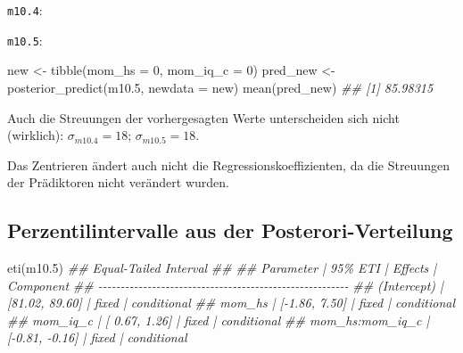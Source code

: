 \documentclass[
  a4paper,
  DIV=11]{scrreprt}
\newenvironment{Shaded}{\begin{snugshade}}{\end{snugshade}}
\newcommand{\AttributeTok}[1]{\textcolor[rgb]{0.40,0.45,0.13}{#1}}
\newcommand{\DecValTok}[1]{\textcolor[rgb]{0.68,0.00,0.00}{#1}}
\newcommand{\DocumentationTok}[1]{\textcolor[rgb]{0.37,0.37,0.37}{\textit{#1}}}
\newcommand{\FloatTok}[1]{\textcolor[rgb]{0.68,0.00,0.00}{#1}}
\newcommand{\FunctionTok}[1]{\textcolor[rgb]{0.28,0.35,0.67}{#1}}
\newcommand{\NormalTok}[1]{\textcolor[rgb]{0.00,0.23,0.31}{#1}}
\newcommand{\OtherTok}[1]{\textcolor[rgb]{0.00,0.23,0.31}{#1}}
\newcommand{\SpecialCharTok}[1]{\textcolor[rgb]{0.37,0.37,0.37}{#1}}
\theoremstyle{definition}
\theoremstyle{remark}
\begin{document}
\texttt{m10.4}:

\begin{Shaded}
\end{Shaded}

\texttt{m10.5}:

\begin{Shaded}
\begin{Highlighting}[]
\NormalTok{new }\OtherTok{\textless{}{-}} \FunctionTok{tibble}\NormalTok{(}\AttributeTok{mom\_hs =} \DecValTok{0}\NormalTok{, }\AttributeTok{mom\_iq\_c =} \DecValTok{0}\NormalTok{)}
\NormalTok{pred\_new }\OtherTok{\textless{}{-}} \FunctionTok{posterior\_predict}\NormalTok{(m10}\FloatTok{.5}\NormalTok{, }\AttributeTok{newdata =}\NormalTok{ new)}
\FunctionTok{mean}\NormalTok{(pred\_new)}
\DocumentationTok{\#\# [1] 85.98315}
\end{Highlighting}
\end{Shaded}

Auch die Streuungen der vorhergesagten Werte unterscheiden sich nicht
(wirklich): \(\sigma_{m10.4}= 18\); \(\sigma_{m10.5}= 18\).

Das Zentrieren ändert auch nicht die Regressionskoeffizienten, da die
Streuungen der Prädiktoren nicht verändert wurden.

\hypertarget{perzentilintervalle-aus-der-posterori-verteilung}{%
\subsection{Perzentilintervalle aus der
Posterori-Verteilung}\label{perzentilintervalle-aus-der-posterori-verteilung}}

\begin{Shaded}
\begin{Highlighting}[]
\FunctionTok{eti}\NormalTok{(m10}\FloatTok{.5}\NormalTok{)}
\DocumentationTok{\#\# Equal{-}Tailed Interval}
\DocumentationTok{\#\# }
\DocumentationTok{\#\# Parameter       |        95\% ETI | Effects |   Component}
\DocumentationTok{\#\# {-}{-}{-}{-}{-}{-}{-}{-}{-}{-}{-}{-}{-}{-}{-}{-}{-}{-}{-}{-}{-}{-}{-}{-}{-}{-}{-}{-}{-}{-}{-}{-}{-}{-}{-}{-}{-}{-}{-}{-}{-}{-}{-}{-}{-}{-}{-}{-}{-}{-}{-}{-}{-}{-}{-}{-}}
\DocumentationTok{\#\# (Intercept)     | [81.02, 89.60] |   fixed | conditional}
\DocumentationTok{\#\# mom\_hs          | [{-}1.86,  7.50] |   fixed | conditional}
\DocumentationTok{\#\# mom\_iq\_c        | [ 0.67,  1.26] |   fixed | conditional}
\DocumentationTok{\#\# mom\_hs:mom\_iq\_c | [{-}0.81, {-}0.16] |   fixed | conditional}
\end{Highlighting}
\end{Shaded}
\end{document}
